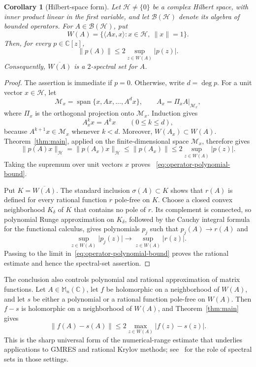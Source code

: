 \documentclass[preprints,article,submit,oneauthor]{Definitions/mdpi}
\newcounter{manuscriptresult}[section]
\theoremstyle{mdpi}
\newtheorem{corollary}[manuscriptresult]{Corollary}
\theoremstyle{definition}
\newcommand{\C}{\mathbb C}
\newcommand{\Mn}{\mathbb M_n(\C)}
\begin{document}
\begin{corollary}[Hilbert-space form]
\label{cor:operator-bound}
Let $\mathcal H\neq\{0\}$ be a complex Hilbert space, with inner
product linear in the first variable, and let $\mathcal B(\mathcal H)$
denote its algebra of bounded operators.  For
$A\in\mathcal B(\mathcal H)$, put
\[
  W(A)=\{\langle Ax,x\rangle:x\in\mathcal H,\ \lVert x\rVert=1\}.
\]
Then, for every $p\in\C[z]$,
\begin{equation}
  \lVert p(A)\rVert
  \leq 2\sup_{z\in W(A)}\lvert p(z)\rvert.
  \label{eq:operator-polynomial-bound}
\end{equation}
Consequently, $\overline{W(A)}$ is a $2$-spectral set for $A$.
\end{corollary}

\begin{proof}
The assertion is immediate if $p=0$.  Otherwise, write $d=\deg p$.
For a unit vector $x\in\mathcal H$, let
\[
  \mathcal M_x=\operatorname{span}\{x,Ax,\ldots,A^d x\},
  \qquad
  A_x=\left.\Pi_x A\right|_{\mathcal M_x},
\]
where $\Pi_x$ is the orthogonal projection onto
$\mathcal M_x$.  Induction gives
\begin{equation}
  A_x^k x=A^k x \qquad(0\leq k\leq d),
  \label{eq:Krylov-agreement}
\end{equation}
because $A^{k+1}x\in\mathcal M_x$ whenever $k<d$.  Moreover,
$W(A_x)\subset W(A)$.  Theorem~\ref{thm:main}, applied on the
finite-dimensional space $\mathcal M_x$, therefore gives
\[
  \lVert p(A)x\rVert_{\mathcal H}
  =\lVert p(A_x)x\rVert_{\mathcal H}
  \leq\lVert p(A_x)\rVert
  \leq2\sup_{z\in W(A)}\lvert p(z)\rvert.
\]
Taking the supremum over unit vectors $x$ proves~%
\eqref{eq:operator-polynomial-bound}.

Put $K=\overline{W(A)}$.  The standard inclusion
$\sigma(A)\subset K$ shows that $r(A)$ is defined for every rational
function $r$ pole-free on $K$.  Choose a closed convex neighborhood
$K_\delta$ of $K$ that contains no pole of $r$.  Its complement is
connected, so polynomial Runge approximation on $K_\delta$, followed
by the Cauchy integral formula for the functional calculus, gives
polynomials $p_j$ such that
$p_j(A)\to r(A)$ and
\[
  \sup_{z\in W(A)}\lvert p_j(z)\rvert
  \longrightarrow
  \sup_{z\in W(A)}\lvert r(z)\rvert.
\]
Passing to the limit in~\eqref{eq:operator-polynomial-bound} proves the
rational estimate and hence the spectral-set assertion.
\end{proof}

The conclusion also controls polynomial and rational approximation of
matrix functions.  Let $A\in\Mn$, let $f$ be holomorphic on a
neighborhood of $W(A)$, and let $s$ be either a polynomial or a
rational function pole-free on $W(A)$.  Then $f-s$ is holomorphic on
a neighborhood of $W(A)$, and Theorem~\ref{thm:main} gives
\begin{equation}
  \lVert f(A)-s(A)\rVert
  \leq2\max_{z\in W(A)}\lvert f(z)-s(z)\rvert.
  \label{eq:matrix-function-error}
\end{equation}
This is the sharp universal form of the numerical-range estimate that
underlies applications to GMRES and rational Krylov methods; see~%
\cite{ChoiGreenbaum2015,CrouzeixGreenbaum2019,ChenGreenbaumTrogdon2025}
for the role of spectral sets in those settings.
\end{document}
